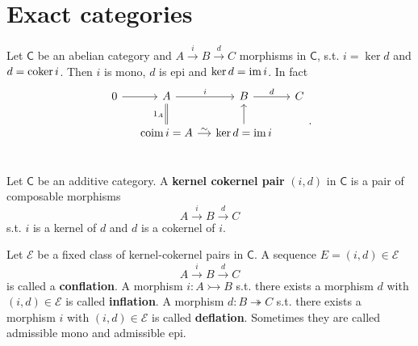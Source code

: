 \section{Exact categories}
\begin{rem}
	Let $\mathsf{C}$ be an abelian category and $A \xrightarrow{i} B \xrightarrow{d} C$ morphisms in $\mathsf{C}$, s.t.
	$i = \ker d$ and $d = \operatorname{coker} i$.
	Then $i$ is mono, $d$ is epi and $\ker d = \operatorname{im} i$.
	In fact 
	\begin{equation}
		\begin{tikzcd}[column sep=small]
		0 \arrow[r, "", rightarrow] &
		A \arrow[r, "i", rightarrow] \arrow[d, "1_A"', equal] &
		B \arrow[r, "d", rightarrow] &
		C \\
		& \mathrm{coim}\, i = A \arrow[r, "\sim", rightarrow] &
		\ker d = \ima i \arrow[u, "", rightarrow] & \\
	\end{tikzcd}
	.\end{equation} 
\end{rem}

\begin{defn}
	Let $\mathsf{C}$ be an additive category.
	A \textbf{kernel cokernel pair} $\left(i, d\right)$ in $\mathsf{C}$ is a pair of composable morphisms
	\begin{equation}
	A \xrightarrow{i} B \xrightarrow{d} C
	\end{equation} 
	s.t. $i$ is a kernel of $d$ and $d$ is a cokernel of $i$.
\end{defn}

\begin{defn}
	Let $\mathcal{E}$ be a fixed class of kernel-cokernel pairs in $\mathsf{C}$.
	A sequence $E = \left(i, d\right) \in \mathcal{E}$
	\begin{equation}
	A \xrightarrow{i} B \xrightarrow{d} C
	\end{equation} 
	is called a \textbf{conflation}.
	A morphism $i: A \rightarrowtail B$ s.t. there exists a morphism $d$ with $\left(i, d\right) \in \mathcal{E}$ is called \textbf{inflation}.
	A morphism $d: B \twoheadrightarrow C$ s.t. there exists a morphism $i$ with $\left(i, d\right) \in \mathcal{E}$ is called \textbf{deflation}.
	Sometimes they are called admissible mono and admissible epi.
\end{defn}

